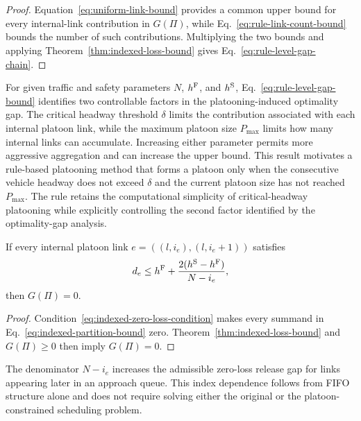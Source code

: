 \begin{proof}
Equation~\eqref{eq:uniform-link-bound} provides a common upper bound for
every internal-link contribution in \(\widehat{G}(\Pi)\), while
Eq.~\eqref{eq:rule-link-count-bound} bounds the number of such contributions.
Multiplying the two bounds and applying
Theorem~\ref{thm:indexed-loss-bound} gives
Eq.~\eqref{eq:rule-level-gap-chain}.
\end{proof}

For given traffic and safety parameters \(N\), \(h^{\mathrm{F}}\), and \(h^{\mathrm{S}}\),
Eq.~\eqref{eq:rule-level-gap-bound} identifies two controllable factors in
the platooning-induced optimality gap. The critical headway threshold
\(\delta\) limits the contribution associated with each internal platoon
link, while the maximum platoon size \(P_{\max}\) limits how many internal
links can accumulate. Increasing either parameter permits more aggressive
aggregation and can increase the upper bound. This result motivates a
rule-based platooning method that forms a platoon only when the consecutive
vehicle headway does not exceed \(\delta\) and the current platoon size has
not reached \(P_{\max}\). The rule retains the computational simplicity of
critical-headway platooning while explicitly controlling the second factor
identified by the optimality-gap analysis.

\begin{corollary}
\label{cor:indexed-zero-loss}
If every internal platoon link
\(e=((l,i_e),(l,i_e+1))\) satisfies
\begin{equation}
d_e
\le
h^{\mathrm{F}}+\frac{2(h^{\mathrm{S}}-h^{\mathrm{F}})}{N-i_e},
\label{eq:indexed-zero-loss-condition}
\end{equation}
then \(G(\Pi)=0\).
\end{corollary}

\begin{proof}
Condition~\eqref{eq:indexed-zero-loss-condition} makes every summand in
Eq.~\eqref{eq:indexed-partition-bound} zero. Theorem~\ref{thm:indexed-loss-bound}
and \(G(\Pi)\ge0\) then imply \(G(\Pi)=0\).
\end{proof}

The denominator \(N-i_e\) increases the admissible zero-loss release gap for
links appearing later in an approach queue. This index dependence follows
from FIFO structure alone and does not require solving either the original or
the platoon-constrained scheduling problem.
